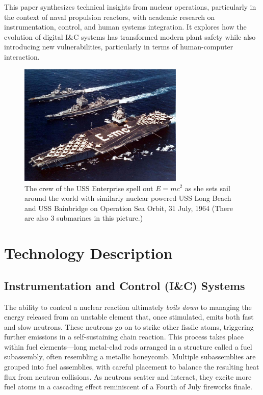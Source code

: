 \documentclass[12pt]{article}
\begin{document}
This paper synthesizes technical insights from nuclear operations, particularly in the context of naval propulsion reactors, with academic research on instrumentation, control, and human systems integration. It explores how the evolution of digital I\&C systems has transformed modern plant safety while also introducing new vulnerabilities, particularly in terms of human-computer interaction.

\begin{figure}[H]
	\centering
	\includegraphics[width=0.7\textwidth]{enterprise}
	\caption{The crew of the USS Enterprise spell out $E = mc^2$ as she sets sail
around the world with similarly nuclear powered USS Long Beach and USS
Bainbridge on Operation Sea Orbit, 31 July, 1964 (There are also 3 submarines in
this picture.)}
\label{fig:enterprise}
\end{figure}

\section{Technology Description}
\subsection{Instrumentation and Control (I\&C) Systems}

The ability to control a nuclear reaction ultimately \textit{boils down} to managing the energy released from an unstable element that, once stimulated, emits both fast and slow neutrons. These neutrons go on to strike other fissile atoms, triggering further emissions in a self-sustaining chain reaction. This process takes place within fuel elements—long metal-clad rods arranged in a structure called a fuel subassembly, often resembling a metallic honeycomb. Multiple subassemblies are grouped into fuel assemblies, with careful placement to balance the resulting heat flux from neutron collisions. As neutrons scatter and interact, they excite more fuel atoms in a cascading effect reminiscent of a Fourth of July fireworks finale.
\end{document}
